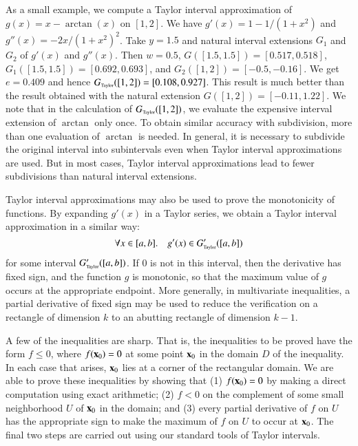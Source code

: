 As a small example, we compute a Taylor interval approximation of
$g(x) = x - \arctan(x)$ on $[1,2]$. We have $g'(x) = 1 - {1}/{(1 + x^2)}$ and $g''(x)
= {-2x}/{(1 + x^2)^2}$. Take $y = 1.5$ and natural interval
extensions $G_1$ and $G_2$ of $g'(x)$ and $g''(x)$. Then $w = 0.5$,
$G([1.5,1.5]) = [0.517,0.518]$, $G_1([1.5,1.5]) = [0.692,0.693]$, and
$G_2([1,2]) = [-0.5, -0.16]$. We get $e = 0.409$ and hence $\GT([1,2])
= [0.108, 0.927]$. This result is much better than the result obtained
with the natural extension $G([1,2]) = [-0.11, 1.22]$. 
We note that in the calculation of $\GT([1,2])$, we evaluate the
expensive interval extension of $\arctan$ only once.  To obtain
similar accuracy with subdivision, more than one evaluation of $\arctan$
is needed.  In general, it is necessary to subdivide the original
interval into subintervals even when Taylor interval approximations are
used. But in most cases, Taylor interval approximations lead to fewer
subdivisions than natural interval extensions.

Taylor interval approximations may also be used to
prove the monotonicity of functions.  By expanding $g'(x)$ in a 
Taylor series, we obtain a Taylor interval approximation in a similar way:
\begin{equation*}
\forall x \in [a,b]. \quad g'(x) \in \GT'([a,b])
\end{equation*}
for some interval $\GT'([a,b])$.  If $0$ is not in this interval, then
the derivative has fixed sign, and the function $g$ is monotonic, so
that the maximum value of $g$ occurs at the appropriate endpoint.
More generally, in multivariate inequalities, a partial derivative of
fixed sign may be used to reduce the verification on a rectangle of
dimension $k$ to an abutting rectangle of dimension $k-1$.

A few of the inequalities are sharp.  That is, the inequalities to be
proved have the form $f \le 0$, where $f({\bf x}_0)=0$ at some point ${\bf x}_0$
in the domain $D$ of the inequality.  In each case that arises, ${\bf x}_0$ lies at a
corner of the rectangular domain.  We are able to prove these
inequalities by showing that (1) $f({\bf x}_0) = 0$ by making a direct
computation using exact arithmetic; (2) $f < 0$ on the complement of
some small neighborhood $U$ of ${\bf x}_0$ in the domain; and (3) every
partial derivative of $f$ on $U$ has the appropriate sign to make the
maximum of $f$ on $U$ to occur at ${\bf x}_0$.  The final two steps are
carried out using our standard tools of Taylor intervals.


